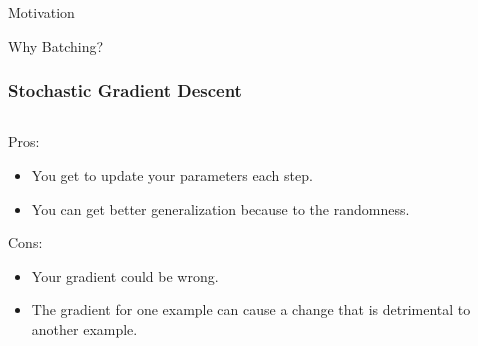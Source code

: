 \documentclass{beamer}
\begin{document}
\begin{section}{Motivation}
\begin{subsection}{Why Batching?}
        \begin{frame}
            \frametitle{Stochastic Gradient Descent}
            \begin{columns}
                \begin{column}{0.5\textwidth}
                    Pros:
                    \begin{itemize}
                        \item You get to update your parameters each step.
                        \item You can get better generalization because to the randomness.
                    \end{itemize}
                    Cons:
                    \begin{itemize}
                        \item Your gradient could be wrong.
                        \item The gradient for one example can cause a change that is detrimental to another example.
                    \end{itemize}
                \end{column}
                \begin{column}{0.5\textwidth}

                \end{column}
            \end{columns}

        \end{frame}


\end{subsection}
\end{section}
\end{document}
